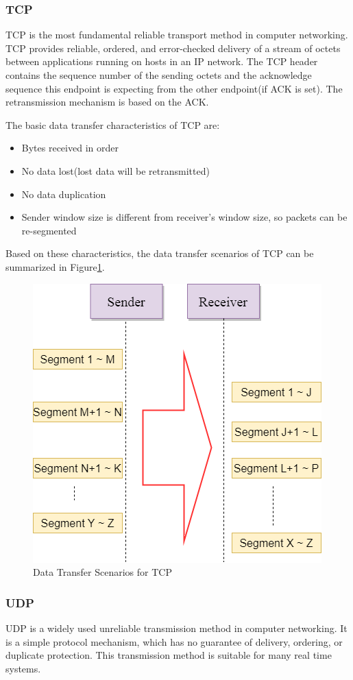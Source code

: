 \subsubsection{TCP}
TCP is the most fundamental reliable transport method in computer networking. TCP provides reliable, ordered, and error-checked delivery of a stream of octets between applications running on hosts in an IP network. The TCP header contains the sequence number of the sending octets and the acknowledge sequence this endpoint is expecting from the other endpoint(if ACK is set). The retransmission mechanism is based on the ACK. 

The basic data transfer characteristics of TCP are:
\begin{itemize}
  \item Bytes received in order
  \item No data lost(lost data will be retransmitted)
  \item No data duplication
  \item Sender window size is different from receiver's window size, so packets can be re-segmented
\end{itemize}

Based on these characteristics,  the data transfer scenarios of TCP can be summarized in Figure\ref{tcp}.
\begin{figure}[H]
\centerline{\includegraphics[scale=0.48]{Figures/tcp}}
 \caption{Data Transfer Scenarios for TCP}
\label{tcp}
\end{figure}

\subsubsection{UDP}
UDP is a widely used unreliable transmission method in computer networking. It is a simple protocol mechanism, which has no guarantee of delivery, ordering, or duplicate protection. This transmission method is suitable for many real time systems. 

